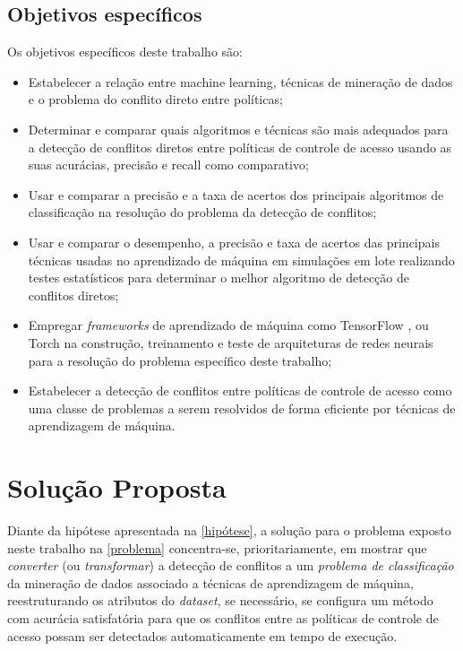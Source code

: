 \documentclass[
	12pt,				%
	openright,			%
	oneside,			%
	a4paper,			%
	english,			%
	french,				%
	spanish,			%
	brazil				%
	]{abntex2}
\begin{document}
\subsection{Objetivos específicos}
Os objetivos específicos deste trabalho são:
\begin{itemize}	
		\item Estabelecer a relação entre machine learning, técnicas de mineração de dados e o problema do conflito direto entre políticas;
		\item Determinar e comparar quais algoritmos e técnicas são mais adequados para a detecção de conflitos diretos entre políticas de controle de acesso usando as suas acurácias, precisão e recall como comparativo;
		\item Usar e comparar a precisão e a taxa de acertos dos principais algoritmos de classificação na resolução do problema da detecção de conflitos;
		\item Usar e comparar o desempenho, a precisão e taxa de acertos das principais técnicas usadas no aprendizado de máquina %
		em simulações em lote realizando testes estatísticos para determinar o melhor algoritmo de detecção de conflitos diretos;		
		\item Empregar \textit{frameworks} de aprendizado de máquina como TensorFlow \cite{kadimisetty_tensorflow_2018}, %
		 ou Torch \cite{NEURIPS2019_9015} na construção, treinamento e teste de arquiteturas de redes neurais para a resolução do problema específico deste trabalho;
		\item Estabelecer a detecção de conflitos entre políticas de controle de acesso como uma  classe de problemas a serem resolvidos de forma eficiente por técnicas de aprendizagem de máquina. 
\end{itemize}


\section{Solução Proposta}\label{solucao_proposta}
Diante da hipótese apresentada na \autoref{hipótese}, a solução para o problema exposto neste trabalho na \autoref{problema} concentra-se, prioritariamente, em mostrar que \textit{converter} (ou \textit{transformar}) a detecção de conflitos a um \textit{problema de classificação} da mineração de dados associado a técnicas de aprendizagem de máquina, reestruturando os atributos do \textit{dataset}, se necessário, se configura um método com acurácia satisfatória para que os conflitos entre as políticas de controle de acesso possam ser detectados automaticamente em tempo de execução.
\end{document}
